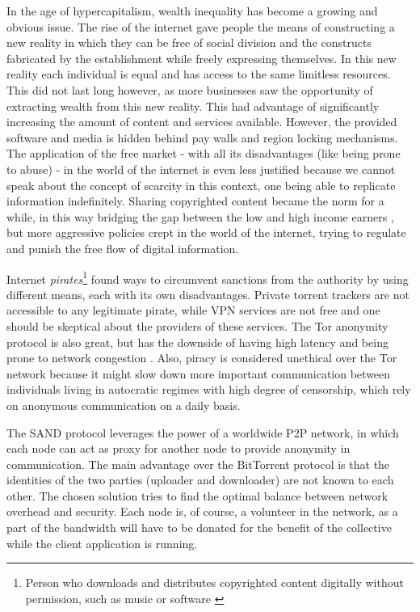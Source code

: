 In the age of hypercapitalism, wealth inequality has become a growing and 
obvious issue. The rise of the internet gave people the means of constructing a 
new reality in which they can be free of social division and the constructs 
fabricated by the establishment while freely expressing themselves. In this new 
reality each individual is equal and has access to the same limitless 
resources. This did not last long however, as more businesses saw the 
opportunity of extracting wealth from this new reality. This had advantage of 
significantly increasing the amount of content and services available. However, 
the provided software and media is hidden behind pay walls and region locking 
mechanisms. The application of the free market - with all its disadvantages 
(like being prone to abuse) - in the world of the internet is even less 
justified because we cannot speak about the concept of scarcity in this 
context, one being able to replicate information indefinitely. Sharing 
copyrighted content became the norm for a while, in this way bridging the gap 
between the low and high income earners \cite{piracyinequality}, but more 
aggressive policies crept in the world of the internet, trying to regulate and 
punish the free flow of digital information.

Internet \textit{pirates}\footnote{Person who downloads and distributes 
copyrighted content digitally without permission, such as music or software 
\cite{CHOI2007168}} found ways to circumvent sanctions from the authority by 
using different means, each with its own disadvantages. Private torrent 
trackers are not accessible to any legitimate pirate, while VPN services are 
not free and one should be skeptical about the providers of these services. The 
Tor anonymity protocol is also great, but has the downside of having high 
latency and being prone to network congestion \cite{torcongestion}. Also, 
piracy is considered unethical over the Tor network because it might slow down 
more important communication between individuals living in autocratic regimes 
with high degree of censorship, which rely on anonymous communication on a 
daily basis.

The SAND protocol leverages the power of a worldwide P2P network, in which each 
node can act as proxy for another node to provide anonymity in communication. 
The main advantage over the BitTorrent protocol is that the identities of the 
two parties (uploader and downloader) are not known to each other. The chosen 
solution tries to find the optimal balance between network overhead and 
security. Each node is, of course, a volunteer in the network, as a part of the 
bandwidth will have to be donated for the benefit of the collective while the 
client application is running.
